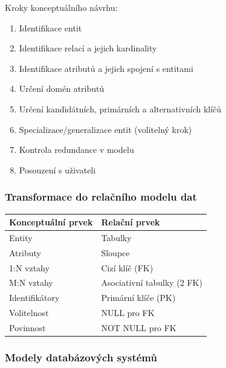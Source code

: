 Kroky konceptuálního návrhu:
\begin{enumerate}
  \item Identifikace entit
  \item Identifikace relací a jejich kardinality
  \item Identifikace atributů a jejich spojení s entitami
  \item Určení domén atributů
  \item Určení kandidátních, primárních a alternativních klíčů
  \item Specializace/generalizace entit (volitelný krok)
  \item Kontrola redundance v modelu
  \item Posouzení s uživateli
\end{enumerate}

\subsubsection{Transformace do relačního modelu dat}

\begin{center}
\begin{tabular}{ll}
\toprule
\textbf{Konceptuální prvek} & \textbf{Relační prvek} \\
\midrule
Entity & Tabulky \\
Atributy & Sloupce \\
1:N vztahy & Cizí klíč (FK) \\
M:N vztahy & Asociativní tabulky (2 FK) \\
Identifikátory & Primární klíče (PK) \\
Volitelnost & NULL pro FK \\
Povinnost & NOT NULL pro FK \\
\bottomrule
\end{tabular}
\end{center}

\subsubsection{Modely databázových systémů}

